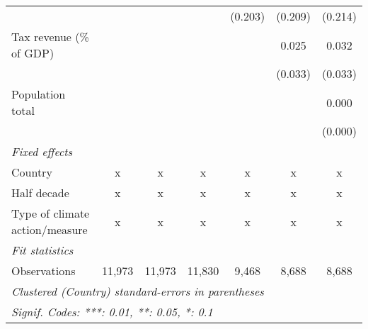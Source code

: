 \begin{tabular}{lcccccc}
                                                 &                &                &                & (0.203)        & (0.209)        & (0.214)\\   
   Tax revenue (\% of GDP)                       &                &                &                &                & 0.025          & 0.032\\   
                                                 &                &                &                &                & (0.033)        & (0.033)\\   
   Population total                              &                &                &                &                &                & 0.000\\   
                                                 &                &                &                &                &                & (0.000)\\   
   \emph{Fixed effects}\\
   Country                                       & x              & x              & x              & x              & x              & x\\  
   Half decade                                   & x              & x              & x              & x              & x              & x\\  
   Type of climate action/measure                & x              & x              & x              & x              & x              & x\\  
   \midrule \emph{Fit statistics}\\
   Observations                                  & 11,973         & 11,973         & 11,830         & 9,468          & 8,688          & 8,688\\  
   \midrule
   \multicolumn{7}{l}{\emph{Clustered (Country) standard-errors in parentheses}}\\
   \multicolumn{7}{l}{\emph{Signif. Codes: ***: 0.01, **: 0.05, *: 0.1}}\\
\end{tabular}
\par\endgroup


